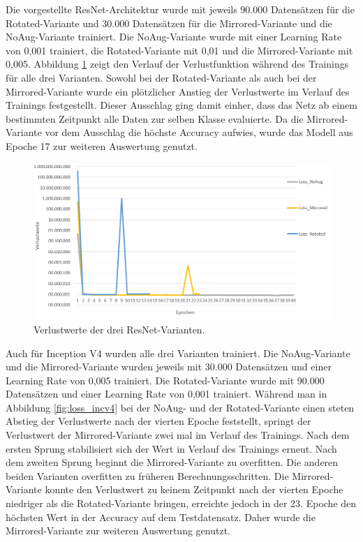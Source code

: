 Die vorgestellte ResNet-Architektur wurde mit jeweils 90.000 Datensätzen für die Rotated-Variante und 30.000 Datensätzen für die Mirrored-Variante und die NoAug-Variante trainiert. Die NoAug-Variante wurde mit einer Learning Rate von 0,001 trainiert, die Rotated-Variante mit 0,01 und die Mirrored-Variante mit 0,005. Abbildung \ref{fig:resnet_loss} zeigt den Verlauf der Verlustfunktion während des Trainings für alle drei Varianten. Sowohl bei der Rotated-Variante als auch bei der Mirrored-Variante wurde ein plötzlicher Anstieg der Verlustwerte im Verlauf des Trainings festgestellt. Dieser Ausschlag ging damit einher, dass das Netz ab einem bestimmten Zeitpunkt alle Daten zur selben Klasse evaluierte. Da die Mirrored-Variante vor dem Ausschlag die höchste Accuracy aufwies, wurde das Modell aus Epoche 17 zur weiteren Auswertung genutzt.

\begin{figure}[H]
\centering
\includegraphics[scale=0.5]{pictures/Auswertung/resnet_loss}

\caption{Verlustwerte der drei ResNet-Varianten.}
\label{fig:resnet_loss}
\end{figure}

Auch für Inception V4 wurden alle drei Varianten trainiert. Die NoAug-Variante und die Mirrored-Variante wurden jeweils mit 30.000 Datensätzen und einer Learning Rate von 0,005 trainiert. Die Rotated-Variante wurde mit 90.000 Datensätzen und einer Learning Rate von 0,001 trainiert. Während man in Abbildung \ref{fig:loss_incv4} bei der NoAug- und der Rotated-Variante einen steten Abstieg der Verlustwerte nach der vierten Epoche feststellt, springt der Verlustwert der Mirrored-Variante zwei mal im Verlauf des Trainings. Nach dem ersten Sprung stabilisiert sich der Wert in Verlauf des Trainings erneut. Nach dem zweiten Sprung beginnt die Mirrored-Variante zu overfitten. Die anderen beiden Varianten overfitten zu früheren Berechnungsschritten. Die Mirrored-Variante konnte den Verlustwert zu keinem Zeitpunkt nach der vierten Epoche niedriger als die Rotated-Variante bringen, erreichte jedoch in der 23. Epoche den höchsten Wert in der Accuracy auf dem Testdatensatz. Daher wurde die Mirrored-Variante zur weiteren Auswertung genutzt.

